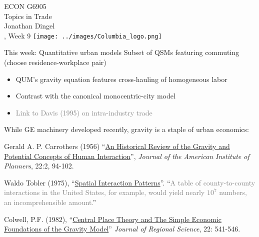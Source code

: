 \documentclass[11pt,notes=hide,aspectratio=169]{beamer}
\begin{document}
\begin{frame}[plain]
\begin{center}
\large
\textcolor{columbiadarkblue}{ECON G6905\\
Topics in Trade\\ 
Jonathan Dingel\\
\semester, Week 9}
\vfill 
\texttt{[image: ../images/Columbia\_logo.png]}
\end{center}
\end{frame}
\begin{frame}{This week: Quantitative urban models}
Subset of QSMs featuring commuting (choose residence-workplace pair)
\begin{itemize}
\item QUM's gravity equation features cross-hauling of homogeneous labor
\item Contrast with the canonical monocentric-city model
\item[] \textcolor{gray}{Link to Davis (1995) on intra-industry trade}
\end{itemize}
\smallskip
While GE machinery developed recently, gravity is a staple of urban economics:
\begin{itemize}{\small
\item Gerald A. P. Carrothers (1956) ``\href{https://doi.org/10.1080/01944365608979229}{An Historical Review of the Gravity and Potential Concepts of Human Interaction}'', \textit{Journal of the American Institute of Planners}, 22:2, 94-102.
\item Waldo Tobler (1975), ``\href{https://pure.iiasa.ac.at/id/eprint/241/1/RR-75-019.pdf}{Spatial Interaction Patterns}''. ``\textcolor{gray}{A table of county-to-county interactions in the United States, for example, would yield nearly $10^7$ numbers, an incomprehensible amount.}''
\item Colwell, P.F. (1982), ``\href{https://doi.org/10.1111/j.1467-9787.1982.tb00775.x}{Central Place Theory and The Simple Economic Foundations of the Gravity Model}'' \textit{Journal of Regional Science}, 22: 541-546.
}\end{itemize}
\end{frame}
\end{document}
